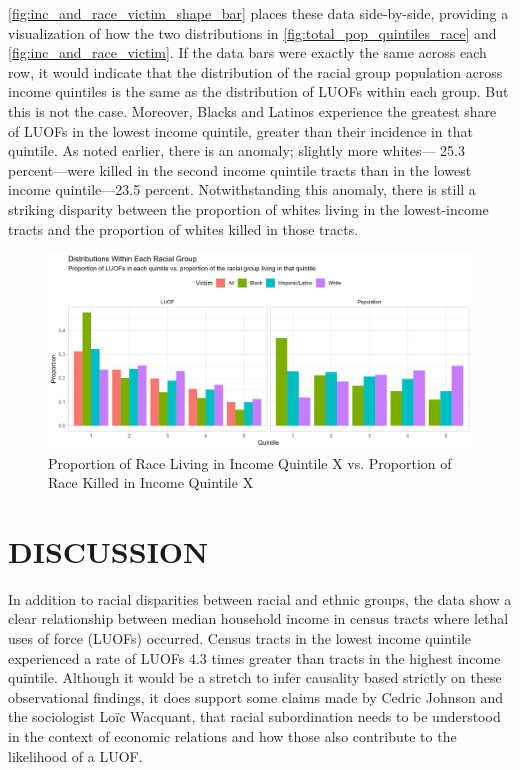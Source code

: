 \documentclass[12pt]{article}
\begin{document}
\autoref{fig:inc_and_race_victim_shape_bar} places these data side-by-side, providing a visualization of how the two distributions in \autoref{fig:total_pop_quintiles_race} and \autoref{fig:inc_and_race_victim}. If the data bars were exactly the same across each row, it would indicate that the distribution of the racial group population across income quintiles is the same as the distribution of LUOFs within each group. But this is not the case. Moreover, Blacks and Latinos experience the greatest share of LUOFs in the lowest income quintile, greater than their incidence in that quintile. As noted earlier, there is an anomaly; slightly more whites— 25.3 percent—were killed in the second income quintile tracts than in the lowest income quintile—23.5 percent. Notwithstanding this anomaly, there is still a striking disparity between the proportion of whites living in the lowest-income tracts and the proportion of whites killed in those tracts.

\begin{figure}[H]
  \centering
  \includegraphics[width=\linewidth]{images/inc_and_race_victim_shape_bar}
  \captionsetup{justification=centering, singlelinecheck=false, margin=2cm}
  \caption{Proportion of Race Living in Income Quintile X vs. Proportion of Race Killed in Income Quintile X}
  \label{fig:inc_and_race_victim_shape_bar}
\end{figure}

\section{DISCUSSION}

In addition to racial disparities between racial and ethnic groups, the data show a clear relationship between median household income in census tracts where lethal uses of force (LUOFs) occurred. Census tracts in the lowest income quintile experienced a rate of LUOFs 4.3 times greater than tracts in the highest income quintile. Although it would be a stretch to infer causality based strictly on these observational findings, it does support some claims made by Cedric Johnson and the sociologist Loïc Wacquant, that racial subordination needs to be understood in the context of economic relations and how those also contribute to the likelihood of a LUOF.
\end{document}
